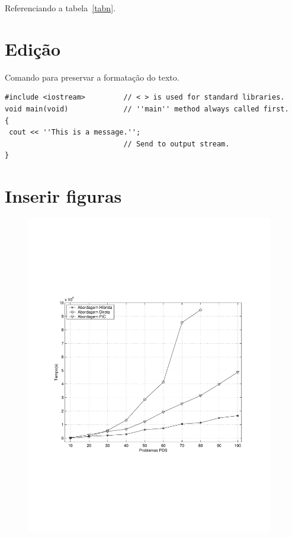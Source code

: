 \documentclass[12pt,fleqn]{article}
\begin{document}
Referenciando a tabela~\ref{tabn}.





\section{Edição}

Comando para preservar a formatação do texto.
\begin{verbatim}
#include <iostream>         // < > is used for standard libraries.
void main(void)             // ''main'' method always called first.
{
 cout << ''This is a message.'';
                            // Send to output stream.
}
\end{verbatim}

\section{Inserir figuras}

\begin{figure}[htb]
	\centering
		\includegraphics[height=14cm]{figura}
	\label{fig:pdsmodel}
\end{figure}

\end{document}
